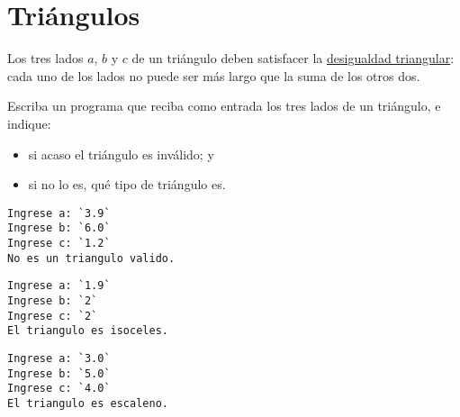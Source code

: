 \section{Triángulos}

Los tres lados \(a\), \(b\) y \(c\) de un triángulo deben
satisfacer la
\href{http://es.wikipedia.org/wiki/Desigualdad\_triangular}{desigualdad
triangular}: cada uno de los lados no puede ser más largo que la suma de
los otros dos.

Escriba un programa que reciba como entrada los tres lados de un
triángulo, e indique:

\begin{itemize}
\item
  si acaso el triángulo es inválido; y
\item
  si no lo es, qué tipo de triángulo es.
\end{itemize}

\begin{lstlisting}[language=testcase]
Ingrese a: `3.9`
Ingrese b: `6.0`
Ingrese c: `1.2`
No es un triangulo valido.
\end{lstlisting}

\begin{lstlisting}[language=testcase]
Ingrese a: `1.9`
Ingrese b: `2`
Ingrese c: `2`
El triangulo es isoceles.
\end{lstlisting}

\begin{lstlisting}[language=testcase]
Ingrese a: `3.0`
Ingrese b: `5.0`
Ingrese c: `4.0`
El triangulo es escaleno.
\end{lstlisting}

